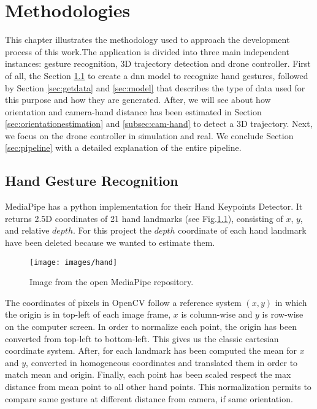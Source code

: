 \chapter{Methodologies}
\label{chap:methods}

This chapter illustrates the methodology used to approach the development process of this work.The application is divided into three main independent instances: gesture recognition, 3D trajectory detection and drone controller. First of all, the Section \ref{sec:handgestrec} to create a \gls{dnn} model to recognize hand gestures, followed by Section \ref{sec:getdata} and \ref{sec:model} that describes the type of data used for this purpose and how they are generated. After, we will see about how orientation and camera-hand distance has been estimated in Section \ref{sec:orientationestimation} and \ref{subsec:cam-hand} to detect a 3D trajectory. Next, we focus on the drone controller in simulation and real. We conclude Section \ref{sec:pipeline} with a detailed explanation of the entire pipeline.


\section{Hand Gesture Recognition}
\label{sec:handgestrec}
MediaPipe has a python implementation for their Hand Keypoints Detector. It returns 2.5D coordinates of 21 hand landmarks (see Fig.\ref{fig:handland}), consisting of $x$, $y$, and relative $depth$. For this project the $depth$ coordinate of each hand landmark have been deleted because we wanted to estimate them.


\begin{figure}[H]
	\centering
	\texttt{[image: images/hand]}
	\caption[Hand Landmarks.]{Image from the open MediaPipe repository.}
	\label{fig:handland}
\end{figure}

\noindent The coordinates of pixels in OpenCV follow a reference system $(x,y)$ in which the origin is in top-left of each image frame, $x$ is column-wise and $y$ is row-wise on the computer screen. In order to normalize each point, the origin has been converted from top-left to bottom-left. This gives us the classic cartesian coordinate system. After, for each landmark has been computed the mean for $x$ and $y$, converted in homogeneous coordinates and translated them in order to match mean and origin. Finally, each point has been scaled respect the max distance from mean point to all other hand points. This normalization permits to compare same gesture at different distance from camera, if same orientation. 

